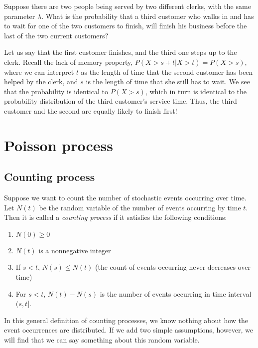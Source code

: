 \documentclass[11pt]{book}
\begin{document}
Suppose there are two people being served by two different clerks, with the same parameter $\lambda$. What is the probability that a third customer who walks in and has to wait for one of the two customers to finish, will finish his business before the last of the two current customers?

Let us say that the first customer finishes, and the third one steps up to the clerk. Recall the lack of memory property, $ P(X > s + t | X > t ) = P(X > s)$, where we can interpret $t$ as the length of time that the second customer has been helped by the clerk, and $s$ is the length of time that she still has to wait. We see that the probability is identical to $P(X > s)$, which in turn is identical to the probability distribution of the third customer's service time. Thus, the third customer and the second are equally likely to finish first!

\section{Poisson process}
\subsection{Counting process}
Suppose we want to count the number of stochastic events occurring over time. Let $N(t)$ be the random variable of the number of events occurring by time $t$. Then it is called a \emph{counting process} if it satisfies the following conditions:
\begin{enumerate}
\item $N(0) \geq 0$

\item $N(t)$ is a nonnegative integer

\item If $s < t$,  $N(s) \leq N(t)$ (the count of events occurring never decreases over time)

\item For $s < t$, $N(t) - N(s)$ is the number of events occurring in time interval $(s,t]$.
\end{enumerate}
In this general definition of counting processes, we know nothing about how the event occurrences are distributed. If we add two simple assumptions, however, we will find that we can say something about this random variable.
\end{document}
